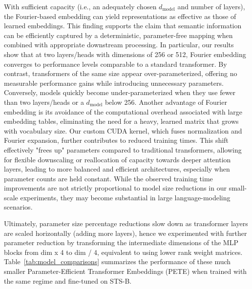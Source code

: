 \documentclass{article}
\begin{document}
With sufficient capacity (i.e., an adequately chosen \(d_{\text{model}}\) and number of layers), the Fourier-based embedding can yield representations as effective as those of learned embeddings. This finding supports the claim that semantic information can be efficiently captured by a deterministic, parameter-free mapping when combined with appropriate downstream processing. In particular, our results show that at two layers/heads with dimensions of 256 or 512, Fourier embedding converges to performance levels comparable to a standard transformer. By contrast, transformers of the same size appear over-parameterized, offering no measurable performance gains while introducing unnecessary parameters. Conversely, models quickly become under-parameterized when they use fewer than two layers/heads or a \(d_{\text{model}}\) below 256. Another advantage of Fourier embedding is its avoidance of the computational overhead associated with large embedding tables, eliminating the need for a heavy, learned matrix that grows with vocabulary size. Our custom CUDA kernel, which fuses normalization and Fourier expansion, further contributes to reduced training times. This shift effectively "frees up" parameters compared to traditional transformers, allowing for flexible downscaling or reallocation of capacity towards deeper attention layers, leading to more balanced and efficient architectures, especially when parameter counts are held constant. While the observed training time improvements are not strictly proportional to model size reductions in our small-scale experiments, they may become substantial in large language-modeling scenarios.

Ultimately, parameter size percentage reductions slow down as transformer layers are scaled horizontally (adding more layers), hence we experimented with further parameter reduction by transforming the intermediate dimensions of the MLP blocks from dim x 4 to dim / 4, equivalent to using lower rank weight matrices. Table~\ref{tab:model_comparisons} summarizes the performance of these much smaller Parameter-Efficient Transformer Embeddings (PETE) when trained with the same regime and fine-tuned on STS-B.
\end{document}
